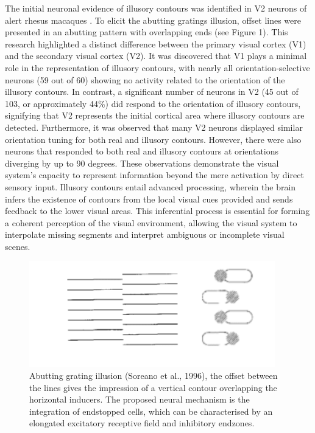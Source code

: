 \documentclass[12pt]{article}
\begin{document}
The initial neuronal evidence of illusory contours was identified in V2 neurons of alert rhesus macaques \autocite{vonderheydtMechanismsContourPerception1989}.
To elicit the abutting gratings illusion, offset lines were presented in an abutting pattern with overlapping ends (see Figure 1). This research highlighted 
a distinct difference between the primary visual  cortex (V1) and the secondary visual cortex (V2). It was discovered that V1 plays a minimal role in the representation of illusory contours, with nearly all orientation-selective neurons (59 out of 60) showing no activity related to the orientation of the illusory contours. In contrast, a significant number of neurons in V2 (45 out of 103, or approximately 44\%) did respond to the orientation of illusory contours, signifying that V2 represents the initial cortical area where illusory contours are detected. Furthermore, it was observed that many V2 neurons displayed similar orientation tuning for both real and illusory contours. However, there were also neurons that responded to both real and illusory contours at  orientations diverging by up to 90 degrees. These observations demonstrate the visual system's capacity to represent information beyond the mere activation by direct sensory input. Illusory contours entail advanced processing, wherein the brain infers the existence of contours from the local visual cues provided and sends feedback to the lower visual areas. 
This inferential process is essential for forming a coherent perception of the visual environment, allowing the visual system to interpolate missing segments and interpret ambiguous or incomplete visual scenes.
  
\begin{figure}
    \centering
    \includegraphics[width=0.95\textwidth]{figures/simple_abutting.png}
    \caption{Abutting grating illusion (Soreano et al., 1996), the offset between the lines gives the impression of a vertical contour overlapping the horizontal inducers. 
    The proposed neural mechanism is the integration of endstopped cells, which can be characterised by an elongated excitatory receptive field and inhibitory endzones.}
    \label{fig:figure_1}
\end{figure}
\end{document}

